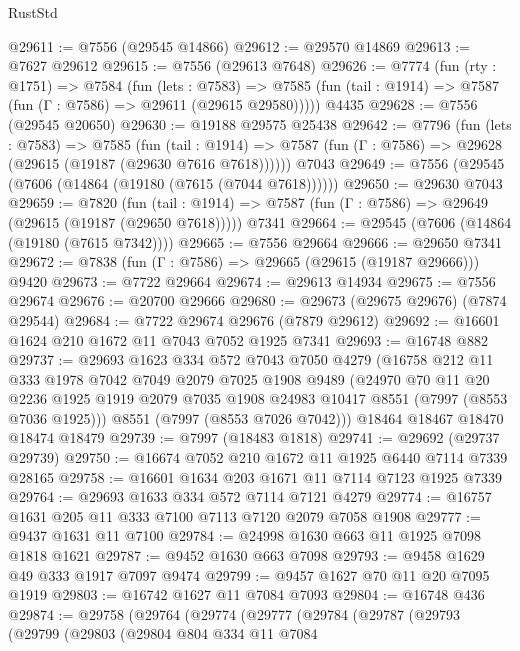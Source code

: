 \begin{lexlean}{RustStd}
\begin{coremodule}
@29611 := @7556 (@29545 @14866)
@29612 := @29570 @14869
@29613 := @7627 @29612
@29615 := @7556 (@29613 @7648)
@29626 := @7774
    (fun (rty : @1751) =>
    @7584
      (fun (lets : @7583) =>
      @7585 (fun (tail : @1914) => @7587 (fun (Γ : @7586) => @29611 (@29615 @29580)))))
    @4435
@29628 := @7556 (@29545 @20650)
@29630 := @19188 @29575 @25438
@29642 := @7796
    (fun (lets : @7583) =>
    @7585
      (fun (tail : @1914) =>
      @7587 (fun (Γ : @7586) => @29628 (@29615 (@19187 (@29630 @7616 @7618))))))
    @7043
@29649 := @7556 (@29545 (@7606 (@14864 (@19180 (@7615 (@7044 @7618))))))
@29650 := @29630 @7043
@29659 := @7820
    (fun (tail : @1914) => @7587 (fun (Γ : @7586) => @29649 (@29615 (@19187 (@29650 @7618)))))
    @7341
@29664 := @29545 (@7606 (@14864 (@19180 (@7615 @7342))))
@29665 := @7556 @29664
@29666 := @29650 @7341
@29672 := @7838 (fun (Γ : @7586) => @29665 (@29615 (@19187 @29666))) @9420
@29673 := @7722 @29664
@29674 := @29613 @14934
@29675 := @7556 @29674
@29676 := @20700 @29666
@29680 := @29673 (@29675 @29676) (@7874 @29544)
@29684 := @7722 @29674 @29676 (@7879 @29612)
@29692 := @16601 @1624 @210 @1672 @11 @7043 @7052 @1925 @7341
@29693 := @16748 @882
@29737 := @29693
    @1623
    @334
    @572
    @7043
    @7050
    @4279
    (@16758
      @212
      @11
      @333
      @1978
      @7042
      @7049
      @2079
      @7025
      @1908
      @9489
      (@24970
        @70
        @11
        @20
        @2236
        @1925
        @1919
        @2079
        @7035
        @1908
        @24983
        @10417
        @8551
        (@7997 (@8553 @7036 @1925)))
      @8551
      (@7997 (@8553 @7026 @7042)))
    @18464
    @18467
    @18470
    @18474
    @18479
@29739 := @7997 (@18483 @1818)
@29741 := @29692 (@29737 @29739)
@29750 := @16674 @7052 @210 @1672 @11 @1925 @6440 @7114 @7339 @28165
@29758 := @16601 @1634 @203 @1671 @11 @7114 @7123 @1925 @7339
@29764 := @29693 @1633 @334 @572 @7114 @7121 @4279
@29774 := @16757 @1631 @205 @11 @333 @7100 @7113 @7120 @2079 @7058 @1908
@29777 := @9437 @1631 @11 @7100
@29784 := @24998 @1630 @663 @11 @1925 @7098 @1818 @1621
@29787 := @9452 @1630 @663 @7098
@29793 := @9458 @1629 @49 @333 @1917 @7097 @9474
@29799 := @9457 @1627 @70 @11 @20 @7095 @1919
@29803 := @16742 @1627 @11 @7084 @7093
@29804 := @16748 @436
@29874 := @29758
    (@29764
      (@29774
        (@29777
          (@29784
            (@29787
              (@29793
                (@29799
                  (@29803
                    (@29804
                      @804
                      @334
                      @11
                      @7084

\end{coremodule}
\end{lexlean}

